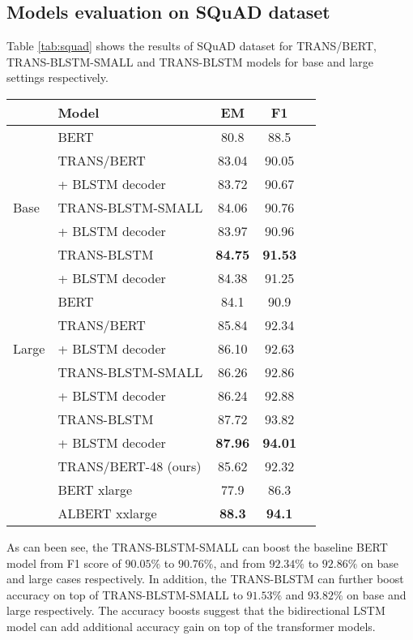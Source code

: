 \documentclass[11pt,a4paper]{article}
\begin{document}
\subsection{Models evaluation on SQuAD dataset} \label{sec:exp_squad}
Table \ref{tab:squad} shows the results of SQuAD dataset for TRANS/BERT, TRANS-BLSTM-SMALL and TRANS-BLSTM models for base and large settings respectively. 
\begin{table*}[!hbpt]
\centering
    \begin{tabular}{llccc}
  & Model & EM & F1 \\ \hline
  & BERT \cite{devlin2018} &  80.8 & 88.5 & \\
   & TRANS/BERT & 83.04 & 90.05\\
   & \hspace{0.1cm} + BLSTM decoder & 83.72 & 90.67 \\ 
   Base & TRANS-BLSTM-SMALL & 84.06 & 90.76\\
   & \hspace{0.1cm} + BLSTM decoder & 83.97& 90.96\\
  & TRANS-BLSTM  & \textbf{84.75} & \textbf{91.53}\\ 
  & \hspace{0.1cm} + BLSTM decoder & 84.38 & 91.25\\
    \hline
    & BERT \cite{devlin2018} &  84.1 & 90.9 & \\
    & TRANS/BERT & 85.84 & 92.34 \\
    Large & \hspace{0.1cm} + BLSTM decoder & 86.10& 92.63\\
   & TRANS-BLSTM-SMALL & 86.26 & 92.86\\ 
   & \hspace{0.1cm} + BLSTM decoder & 86.24 & 92.88  \\
   & TRANS-BLSTM & 87.72 & 93.82 \\ 
   & \hspace{0.1cm} + BLSTM decoder & \textbf{87.96} &  \textbf{94.01} \\ 
   & TRANS/BERT-48 (ours) & 85.62& 92.32 & \\ \hline
      
   & BERT xlarge \cite{lan2019} &  77.9 &  86.3 & \\
   & ALBERT xxlarge \cite{lan2019} & \textbf{88.3} & \textbf{94.1} & \\ \hline
\end{tabular}
    \caption{SQuAD development results for TRANS/BERT, TRANS-BLSTM-SMALL, and TRANS-BLSTM on base and large settings respectively.}
\label{tab:squad}
\end{table*} 
As can been see, the TRANS-BLSTM-SMALL can boost the baseline BERT model from F1 score of $90.05\%$ to $90.76\%$, and from $92.34\%$ to $92.86\%$ on base and large cases respectively. In addition, the TRANS-BLSTM can further boost accuracy on top of TRANS-BLSTM-SMALL to $91.53\%$ and $93.82\%$ on base and large respectively. The accuracy boosts suggest that the bidirectional LSTM model can add additional accuracy gain on top of the transformer models. 
\end{document}
